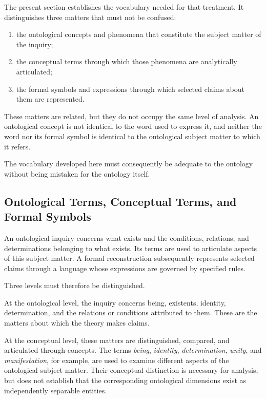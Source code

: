 The present section establishes the vocabulary needed for
that treatment. It distinguishes three matters that must not
be confused:

\begin{enumerate}
    \item the ontological concepts and phenomena that constitute
    the subject matter of the inquiry;
    \item the conceptual terms through which those phenomena
    are analytically articulated;
    \item the formal symbols and expressions through which
    selected claims about them are represented.
\end{enumerate}

These matters are related, but they do not occupy the same
level of analysis. An ontological concept is not identical
to the word used to express it, and neither the word nor
its formal symbol is identical to the ontological subject
matter to which it refers.

The vocabulary developed here must consequently be adequate
to the ontology without being mistaken for the ontology itself.

\subsection{Ontological Terms, Conceptual Terms, and Formal Symbols}

An ontological inquiry concerns what exists and the conditions,
relations, and determinations belonging to what exists. Its
terms are used to articulate aspects of this subject matter.
A formal reconstruction subsequently represents selected
claims through a language whose expressions are governed by
specified rules.

Three levels must therefore be distinguished.

At the ontological level, the inquiry concerns being, existents,
identity, determination, and the relations or conditions
attributed to them. These are the matters about which the
theory makes claims.

At the conceptual level, these matters are distinguished,
compared, and articulated through concepts. The terms
\emph{being}, \emph{identity}, \emph{determination},
\emph{unity}, and \emph{manifestation}, for example, are
used to examine different aspects of the ontological subject
matter. Their conceptual distinction is necessary for
analysis, but does not establish that the corresponding
ontological dimensions exist as independently separable
entities.

